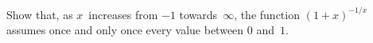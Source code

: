 Show that, as $x$~increases from $-1$ towards~$\infty$, the function
$(1 + x)^{-1/x}$ assumes once and only once every value between $0$ and~$1$. 

